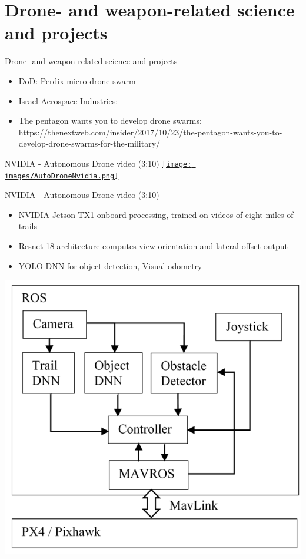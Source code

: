 \documentclass[aspectratio=169]{beamer}
\begin{document}
\section{Drone- and weapon-related science and projects}
\begin{frame}{Drone- and weapon-related science and projects}
	\begin{itemize}
		\item DoD: Perdix micro-drone-swarm
		\item Israel Aerospace Industries: 
        \item The pentagon wants you to develop drone swarms: https://thenextweb.com/insider/2017/10/23/the-pentagon-wants-you-to-develop-drone-swarms-for-the-military/
	\end{itemize}
\end{frame}

\begin{frame}{NVIDIA - Autonomous Drone video (3:10)}
        	\centering
            \href{run:./videos/AutoDroneNvidia.mp4?autostart}
            {\texttt{[image: images/AutoDroneNvidia.png]}}
\end{frame}

\begin{frame}{NVIDIA - Autonomous Drone video (3:10)}
	\begin{itemize}
		\item NVIDIA Jetson TX1 onboard processing, trained on videos of eight miles of trails
		\item Resnet-18 architecture computes view orientation and lateral offset output
		\item YOLO DNN for object detection, Visual odometry
	\end{itemize}
	\centering
	\includegraphics[width=.4\textwidth]{images/nvidia_controller.png}
	
	\tiny{\color{gray}{https://arxiv.org/pdf/1705.02550.pdf}}
	
\end{frame}
\end{document}
